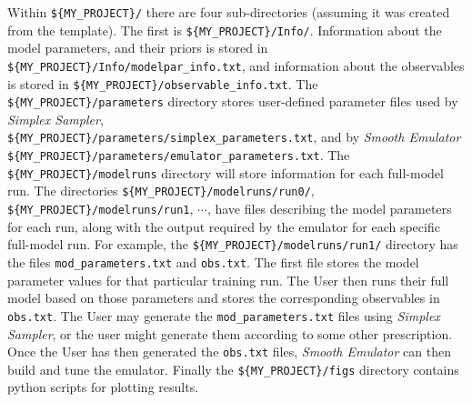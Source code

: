 \documentclass[UserManual.tex]{subfiles}
\begin{document}
Within {\tt \$\{MY\_PROJECT\}/} there are four sub-directories (assuming it was created from the template). The first is {\tt \$\{MY\_PROJECT\}/Info/}. Information about the model parameters, and their priors is stored in {\tt \$\{MY\_PROJECT\}/Info/modelpar\_info.txt}, and information about the observables is stored in {\tt \$\{MY\_PROJECT\}/observable\_info.txt}. The {\tt \$\{MY\_PROJECT\}/parameters} directory stores user-defined parameter files used by {\it Simplex Sampler},\\ {\tt \$\{MY\_PROJECT\}/parameters/simplex\_parameters.txt}, and by {\it Smooth Emulator}\\{\tt \$\{MY\_PROJECT\}/parameters/emulator\_parameters.txt}. The {\tt\$\{MY\_PROJECT\}/modelruns} directory will store information for each full-model run. The directories {\tt  \$\{MY\_PROJECT\}/modelruns/run0/}, {\tt  \$\{MY\_PROJECT\}/modelruns/run1}, $\cdots$, have files describing the model parameters for each run, along with the output required by the emulator for each specific full-model run. For example, the {\tt  \$\{MY\_PROJECT\}/modelruns/run1/} directory has the files {\tt mod\_parameters.txt} and {\tt obs.txt}. The first file stores the model parameter values for that particular training run. The User then runs their full model based on those parameters and stores the corresponding observables in {\tt obs.txt}. The User may generate the {\tt mod\_parameters.txt} files using {\it Simplex Sampler}, or the user might generate them according to some other prescription. Once the User has then generated the {\tt obs.txt} files, {\it Smooth Emulator} can then build and tune the emulator. Finally the {\tt\$\{MY\_PROJECT\}/figs} directory contains python scripts for plotting results.
\end{document}
